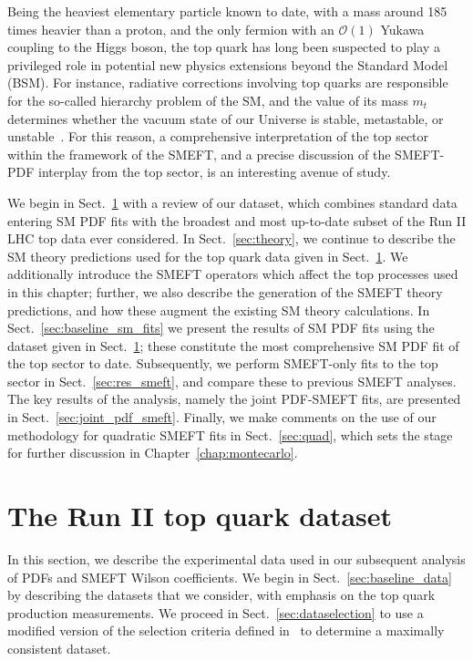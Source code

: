 \documentclass[withindex,glossary]{cam-thesis}
\begin{document}
Being the heaviest elementary particle known to date, with a mass around 185 times heavier than a proton,
and the only fermion with an $\mathcal{O}(1)$
Yukawa coupling to the Higgs boson, the top quark has long been suspected to play a privileged role
in potential new physics extensions beyond the Standard Model (BSM).
%
For instance, radiative corrections involving top quarks are responsible
for the so-called hierarchy problem of the SM, and the value of its mass $m_t$ determines
whether the vacuum state of our Universe is stable, metastable,
or unstable~\cite{Isidori:2001bm,Buttazzo:2013uya,DiLuzio:2015iua}. For this reason,
a comprehensive interpretation of the top sector within the framework of the SMEFT, and a 
precise discussion of the SMEFT-PDF interplay from the top sector, is an interesting avenue of study.

We begin in Sect.~\ref{sec:exp} with a review of our dataset, which combines standard data entering SM PDF fits with the broadest and most up-to-date subset of the Run II LHC top data ever considered. In Sect.~\ref{sec:theory}, we continue to describe the SM theory predictions used for the top quark data given in Sect.~\ref{sec:exp}. We additionally introduce the SMEFT operators which affect the top processes used in this chapter; further, we also describe the generation of the SMEFT theory predictions, and how these augment the existing SM theory calculations. In Sect.~\ref{sec:baseline_sm_fits} we present the results of SM PDF fits using the dataset given in Sect.~\ref{sec:exp}; these constitute the most comprehensive SM PDF fit of the top sector to date. Subsequently, we perform SMEFT-only fits to the top sector in Sect.~\ref{sec:res_smeft}, and compare these to previous SMEFT analyses. The key results of the analysis, namely the joint PDF-SMEFT fits, are presented in Sect.~\ref{sec:joint_pdf_smeft}. Finally, we make comments on the use of our methodology for quadratic SMEFT fits in Sect.~\ref{sec:quad}, which sets the stage for further discussion in Chapter~\ref{chap:montecarlo}.


\section{The Run II top quark dataset}
\label{sec:exp}

In this section, we describe the experimental data used in our subsequent analysis of PDFs and SMEFT Wilson coefficients. We begin in Sect.~\ref{sec:baseline_data} by 
describing the datasets that we consider, with
emphasis on the top quark production measurements. We proceed in Sect.~\ref{sec:dataselection} 
to use a modified version of the selection criteria
defined in~\cite{NNPDF:2021njg}
to determine a maximally consistent dataset.
\end{document}
